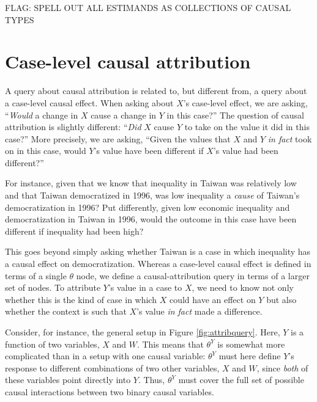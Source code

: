 \documentclass[12pt,]{book}
\begin{document}
FLAG: SPELL OUT ALL ESTIMANDS AS COLLECTIONS OF CAUSAL TYPES

\hypertarget{case-level-causal-attribution}{%
\section{Case-level causal attribution}\label{case-level-causal-attribution}}

A query about causal attribution is related to, but different from, a query about a case-level causal effect. When asking about \(X\)'s case-level effect, we are asking, ``\emph{Would} a change in \(X\) cause a change in \(Y\) in this case?'' The question of causal attribution is slightly different: ``\emph{Did} \(X\) cause \(Y\) to take on the value it did in this case?'' More precisely, we are asking, ``Given the values that \(X\) and \(Y\) \emph{in fact} took on in this case, would \(Y\)'s value have been different if \(X\)'s value had been different?''

For instance, given that we know that inequality in Taiwan was relatively low and that Taiwan democratized in 1996, was low inequality a \emph{cause} of Taiwan's democratization in 1996? Put differently, given low economic inequality and democratization in Taiwan in 1996, would the outcome in this case have been different if inequality had been high?

This goes beyond simply asking whether Taiwan is a case in which inequality has a causal effect on democratization. Whereas a case-level causal effect is defined in terms of a single \(\theta\) node, we define a causal-attribution query in terms of a larger set of nodes. To attribute \(Y\)'s value in a case to \(X\), we need to know not only whether this is the kind of case in which \(X\) could have an effect on \(Y\) but also whether the context is such that \(X\)'s value \emph{in fact} made a difference.

Consider, for instance, the general setup in Figure \ref{fig:attribquery}. Here, \(Y\) is a function of two variables, \(X\) and \(W\). This means that \(\theta^Y\) is somewhat more complicated than in a setup with one causal variable: \(\theta^Y\) must here define \(Y\)'s response to different combinations of two other variables, \(X\) and \(W\), since \emph{both} of these variables point directly into \(Y\). Thus, \(\theta^Y\) must cover the full set of possible causal interactions between two binary causal variables.
\end{document}
